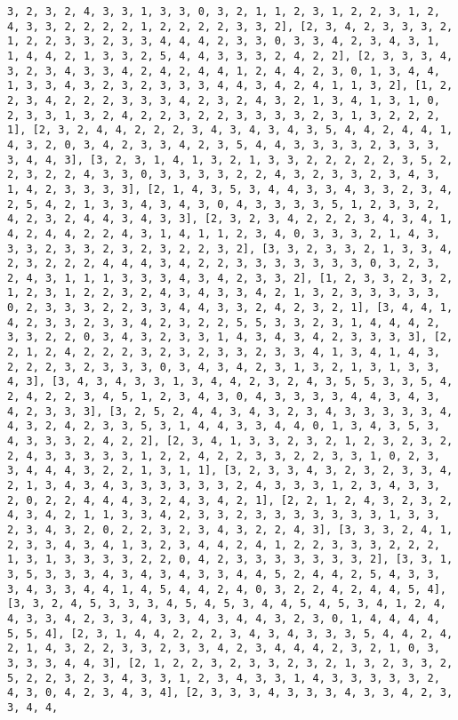 \documentclass[11pt]{article}
\begin{document}
\begin{Verbatim}[commandchars=\\\{\}]
3, 2, 3, 2, 4, 3, 3, 1, 3, 3, 0, 3, 2, 1, 1, 2, 3, 1, 2, 2, 3, 1, 2, 4, 3, 3, 2, 2, 2, 2, 1, 2, 2, 2, 2, 3, 3, 2], [2, 3, 4, 2, 3, 3, 3, 2, 1, 2, 2, 3, 3, 2, 3, 3, 4, 4, 4, 2, 3, 3, 0, 3, 3, 4, 2, 3, 4, 3, 1, 1, 4, 4, 2, 1, 3, 3, 2, 5, 4, 4, 3, 3, 3, 2, 4, 2, 2], [2, 3, 3, 3, 4, 3, 2, 3, 4, 3, 3, 4, 2, 4, 2, 4, 4, 1, 2, 4, 4, 2, 3, 0, 1, 3, 4, 4, 1, 3, 3, 4, 3, 2, 3, 2, 3, 3, 3, 4, 4, 3, 4, 2, 4, 1, 1, 3, 2], [1, 2, 2, 3, 4, 2, 2, 2, 3, 3, 3, 4, 2, 3, 2, 4, 3, 2, 1, 3, 4, 1, 3, 1, 0, 2, 3, 3, 1, 3, 2, 4, 2, 2, 3, 2, 2, 3, 3, 3, 3, 2, 3, 1, 3, 2, 2, 2, 1], [2, 3, 2, 4, 4, 2, 2, 2, 3, 4, 3, 4, 3, 4, 3, 5, 4, 4, 2, 4, 4, 1, 4, 3, 2, 0, 3, 4, 2, 3, 3, 4, 2, 3, 5, 4, 4, 3, 3, 3, 3, 2, 3, 3, 3, 3, 4, 4, 3], [3, 2, 3, 1, 4, 1, 3, 2, 1, 3, 3, 2, 2, 2, 2, 2, 3, 5, 2, 2, 3, 2, 2, 4, 3, 3, 0, 3, 3, 3, 3, 2, 2, 4, 3, 2, 3, 3, 2, 3, 4, 3, 1, 4, 2, 3, 3, 3, 3], [2, 1, 4, 3, 5, 3, 4, 4, 3, 3, 4, 3, 3, 2, 3, 4, 2, 5, 4, 2, 1, 3, 3, 4, 3, 4, 3, 0, 4, 3, 3, 3, 3, 5, 1, 2, 3, 3, 2, 4, 2, 3, 2, 4, 4, 3, 4, 3, 3], [2, 3, 2, 3, 4, 2, 2, 2, 3, 4, 3, 4, 1, 4, 2, 4, 4, 2, 2, 4, 3, 1, 4, 1, 1, 2, 3, 4, 0, 3, 3, 3, 2, 1, 4, 3, 3, 3, 2, 3, 3, 2, 3, 2, 3, 2, 2, 3, 2], [3, 3, 2, 3, 3, 2, 1, 3, 3, 4, 2, 3, 2, 2, 2, 4, 4, 4, 3, 4, 2, 2, 3, 3, 3, 3, 3, 3, 3, 0, 3, 2, 3, 2, 4, 3, 1, 1, 1, 3, 3, 3, 4, 3, 4, 2, 3, 3, 2], [1, 2, 3, 3, 2, 3, 2, 1, 2, 3, 1, 2, 2, 3, 2, 4, 3, 4, 3, 3, 4, 2, 1, 3, 2, 3, 3, 3, 3, 3, 0, 2, 3, 3, 3, 2, 2, 3, 3, 4, 4, 3, 3, 2, 4, 2, 3, 2, 1], [3, 4, 4, 1, 4, 2, 3, 3, 2, 3, 3, 4, 2, 3, 2, 2, 5, 5, 3, 3, 2, 3, 1, 4, 4, 4, 2, 3, 3, 2, 2, 0, 3, 4, 3, 2, 3, 3, 1, 4, 3, 4, 3, 4, 2, 3, 3, 3, 3], [2, 2, 1, 2, 4, 2, 2, 2, 3, 2, 3, 2, 3, 3, 2, 3, 3, 4, 1, 3, 4, 1, 4, 3, 2, 2, 2, 3, 2, 3, 3, 3, 0, 3, 4, 3, 4, 2, 3, 1, 3, 2, 1, 3, 1, 3, 3, 4, 3], [3, 4, 3, 4, 3, 3, 1, 3, 4, 4, 2, 3, 2, 4, 3, 5, 5, 3, 3, 5, 4, 2, 4, 2, 2, 3, 4, 5, 1, 2, 3, 4, 3, 0, 4, 3, 3, 3, 3, 4, 4, 3, 4, 3, 4, 2, 3, 3, 3], [3, 2, 5, 2, 4, 4, 3, 4, 3, 2, 3, 4, 3, 3, 3, 3, 3, 4, 4, 3, 2, 4, 2, 3, 3, 5, 3, 1, 4, 4, 3, 3, 4, 4, 0, 1, 3, 4, 3, 5, 3, 4, 3, 3, 3, 2, 4, 2, 2], [2, 3, 4, 1, 3, 3, 2, 3, 2, 1, 2, 3, 2, 3, 2, 2, 4, 3, 3, 3, 3, 3, 1, 2, 2, 4, 2, 2, 3, 3, 2, 2, 3, 3, 1, 0, 2, 3, 3, 4, 4, 4, 3, 2, 2, 1, 3, 1, 1], [3, 2, 3, 3, 4, 3, 2, 3, 2, 3, 3, 4, 2, 1, 3, 4, 3, 4, 3, 3, 3, 3, 3, 3, 2, 4, 3, 3, 3, 1, 2, 3, 4, 3, 3, 2, 0, 2, 2, 4, 4, 4, 3, 2, 4, 3, 4, 2, 1], [2, 2, 1, 2, 4, 3, 2, 3, 2, 4, 3, 4, 2, 1, 1, 3, 3, 4, 2, 3, 3, 2, 3, 3, 3, 3, 3, 3, 3, 1, 3, 3, 2, 3, 4, 3, 2, 0, 2, 2, 3, 2, 3, 4, 3, 2, 2, 4, 3], [3, 3, 3, 2, 4, 1, 2, 3, 3, 4, 3, 4, 1, 3, 2, 3, 4, 4, 2, 4, 1, 2, 2, 3, 3, 3, 2, 2, 2, 1, 3, 1, 3, 3, 3, 3, 2, 2, 0, 4, 2, 3, 3, 3, 3, 3, 3, 3, 2], [3, 3, 1, 3, 5, 3, 3, 3, 4, 3, 4, 3, 4, 3, 3, 4, 4, 5, 2, 4, 4, 2, 5, 4, 3, 3, 3, 4, 3, 3, 4, 4, 1, 4, 5, 4, 4, 2, 4, 0, 3, 2, 2, 4, 2, 4, 4, 5, 4], [3, 3, 2, 4, 5, 3, 3, 3, 4, 5, 4, 5, 3, 4, 4, 5, 4, 5, 3, 4, 1, 2, 4, 4, 3, 3, 4, 2, 3, 3, 4, 3, 3, 4, 3, 4, 4, 3, 2, 3, 0, 1, 4, 4, 4, 4, 5, 5, 4], [2, 3, 1, 4, 4, 2, 2, 2, 3, 4, 3, 4, 3, 3, 3, 5, 4, 4, 2, 4, 2, 1, 4, 3, 2, 2, 3, 3, 2, 3, 3, 4, 2, 3, 4, 4, 4, 2, 3, 2, 1, 0, 3, 3, 3, 3, 4, 4, 3], [2, 1, 2, 2, 3, 2, 3, 3, 2, 3, 2, 1, 3, 2, 3, 3, 2, 5, 2, 2, 3, 2, 3, 4, 3, 3, 1, 2, 3, 4, 3, 3, 1, 4, 3, 3, 3, 3, 3, 2, 4, 3, 0, 4, 2, 3, 4, 3, 4], [2, 3, 3, 3, 4, 3, 3, 3, 4, 3, 3, 4, 2, 3, 3, 4, 4, 
\end{Verbatim}
\end{document}
